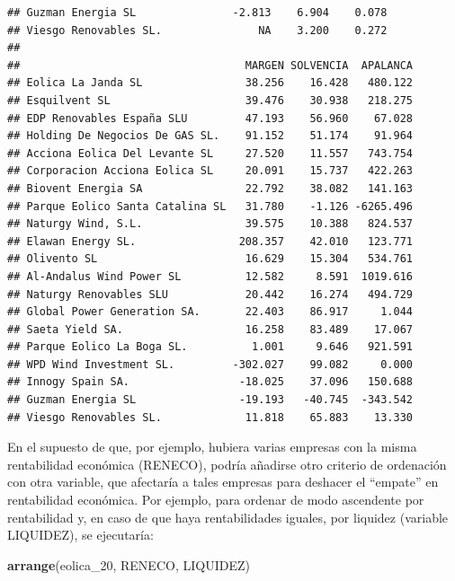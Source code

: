 \documentclass[
]{book}
\newenvironment{Shaded}{\begin{snugshade}}{\end{snugshade}}
\newcommand{\FunctionTok}[1]{\textcolor[rgb]{0.13,0.29,0.53}{\textbf{#1}}}
\newcommand{\NormalTok}[1]{#1}
\begin{document}
\begin{verbatim}
## Guzman Energia SL               -2.813    6.904    0.078
## Viesgo Renovables SL.               NA    3.200    0.272
## 
##                                   MARGEN SOLVENCIA  APALANCA
## Eolica La Janda SL                38.256    16.428   480.122
## Esquilvent SL                     39.476    30.938   218.275
## EDP Renovables España SLU         47.193    56.960    67.028
## Holding De Negocios De GAS SL.    91.152    51.174    91.964
## Acciona Eolica Del Levante SL     27.520    11.557   743.754
## Corporacion Acciona Eolica SL     20.091    15.737   422.263
## Biovent Energia SA                22.792    38.082   141.163
## Parque Eolico Santa Catalina SL   31.780    -1.126 -6265.496
## Naturgy Wind, S.L.                39.575    10.388   824.537
## Elawan Energy SL.                208.357    42.010   123.771
## Olivento SL                       16.629    15.304   534.761
## Al-Andalus Wind Power SL          12.582     8.591  1019.616
## Naturgy Renovables SLU            20.442    16.274   494.729
## Global Power Generation SA.       22.403    86.917     1.044
## Saeta Yield SA.                   16.258    83.489    17.067
## Parque Eolico La Boga SL.          1.001     9.646   921.591
## WPD Wind Investment SL.         -302.027    99.082     0.000
## Innogy Spain SA.                 -18.025    37.096   150.688
## Guzman Energia SL                -19.193   -40.745  -343.542
## Viesgo Renovables SL.             11.818    65.883    13.330
\end{verbatim}

En el supuesto de que, por ejemplo, hubiera varias empresas con la misma rentabilidad económica (RENECO), podría añadirse otro criterio de ordenación con otra variable, que afectaría a tales empresas para deshacer el ``empate'' en rentabilidad económica. Por ejemplo, para ordenar de modo ascendente por rentabilidad y, en caso de que haya rentabilidades iguales, por liquidez (variable LIQUIDEZ), se ejecutaría:

\begin{Shaded}
\begin{Highlighting}[]
\FunctionTok{arrange}\NormalTok{(eolica\_20, RENECO, LIQUIDEZ)}
\end{Highlighting}
\end{Shaded}
\end{document}

